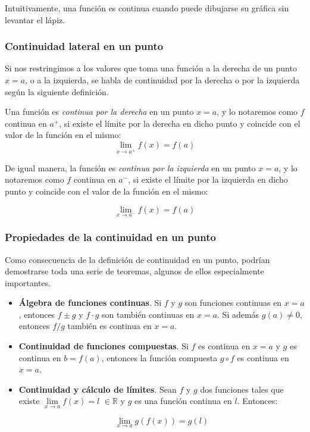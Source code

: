 Intuitivamente, una función es continua cuando puede dibujarse su
gráfica sin levantar el lápiz.

\subsubsection*{Continuidad lateral en un punto}

Si nos restringimos a los valores que toma una función a la derecha
de un punto $x=a$, o a la izquierda, se habla de continuidad por la
derecha o por la izquierda según la siguiente definición.

Una función es \emph{continua por la derecha} en un punto $x=a$, y
lo notaremos como $f$ continua en $a^+$, si existe el límite por la
derecha en dicho punto y coincide con el valor de la función en el
mismo:
\[
\mathop {\lim }\limits_{x \to a^ +  } f\left( x \right) = f\left( a
\right)
\]

De igual manera, la función es \emph{continua por la izquierda} en
un punto $x=a$, y lo notaremos como $f$ continua en $a^-$, si existe
el límite por la izquierda en dicho punto y coincide con el valor de
la función en el mismo:

\[
\mathop {\lim }\limits_{x \to a^ -  } f\left( x \right) = f\left( a
\right)
\]


\subsubsection*{Propiedades de la continuidad en un punto}

Como consecuencia de la definición de continuidad en un punto,
podrían demostrarse toda una serie de teoremas, algunos de ellos
especialmente importantes.

\begin{itemize}

\item \textbf{Álgebra de funciones continuas}.
Si $f$ y $g$ son funciones continuas en $x=a$, entonces $f\pm g$ y
$f\cdot g$ son también continuas en $x=a$. Si además $g(a)\neq 0$,
entonces $f/g$ también es continua en $x=a$.

\item \textbf{Continuidad de funciones compuestas}. Si $f$ es continua en
$x=a$ y $g$ es continua en $b=f(a)$, entonces la función compuesta
$g\circ f$ es continua en $x=a$.

\item \textbf{Continuidad y cálculo de límites}. Sean $f$ y $g$ dos
funciones tales que existe $\mathop {\lim }\limits_{x \to a} f(x) =
l$ $\in \mathbb{R}$ y $g$ es una función continua en $l$. Entonces:

\[
\mathop {\lim }\limits_{x \to a} g\left( {f\left( x \right)} \right)
= g\left( l \right)
\]

\end{itemize}

